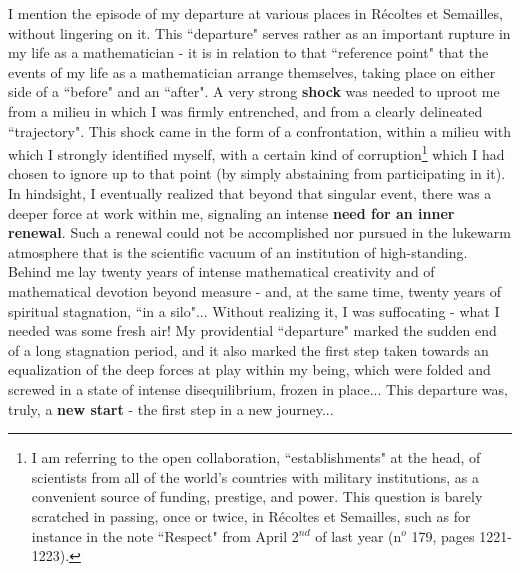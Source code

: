 I mention the episode of my departure at various places in R\'ecoltes et Semailles, without lingering on it. This ``departure" serves rather as an important rupture in my life as a mathematician - it is in relation to that ``reference point" that the events of my life as a mathematician arrange themselves, taking place on either side of a ``before" and an ``after". A very strong \textbf{shock} was needed to uproot me from a milieu in which I was firmly entrenched, and from a clearly delineated ``trajectory". This shock came in the form of a confrontation, within a milieu with which I strongly identified myself, with a certain kind of corruption\footnote{I am referring to the open collaboration, ``establishments" at the head, of scientists from all of the world's countries with military institutions, as a convenient source of funding, prestige, and power. This question is barely scratched in passing, once or twice, in R\'ecoltes et Semailles, such as for instance in the note ``Respect" from April 2$^{nd}$ of last year (n$^o$ 179, pages 1221-1223).
} which I had chosen to ignore up to that point (by simply abstaining from participating in it). In hindsight, I eventually realized that beyond that singular event, there was a deeper force at work within me, signaling an intense \textbf{need for an inner renewal}. Such a renewal could not be accomplished nor pursued in the lukewarm atmosphere that is the scientific vacuum of an institution of high-standing. Behind me lay twenty years of intense mathematical creativity and of mathematical devotion beyond measure - and, at the same time, twenty years of spiritual stagnation, ``in a silo"... Without realizing it, I was suffocating - what I needed was some fresh air! My providential ``departure" marked the sudden end of a long stagnation period, and it also marked the first step taken towards an equalization of the deep forces at play within my being, which were folded and screwed in a state of intense disequilibrium, frozen in place... This departure was, truly, a \textbf{new start} - the first step in a new journey...

